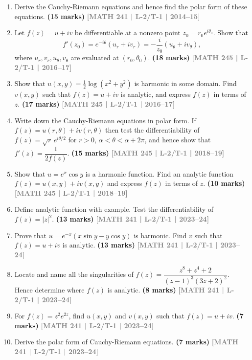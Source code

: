 \documentclass[12pt,a4paper]{article}
\newcommand{\yr}[1]{\hfill\textcolor{gray}{\small\textbf{[#1]}}}
\newcommand{\mk}[1]{\textcolor{orange!70!black}{\small\textbf{(#1 marks)}}}
\begin{document}
\begin{enumerate}
\item Derive the Cauchy-Riemann equations and hence find the polar form of these equations.
\mk{15} \yr{MATH 241 | L-2/T-1 | 2014--15}

\item Let $f(z)=u+iv$ be differentiable at a nonzero point $z_{0}=r_{0}e^{i\theta_{0}}$. Show that
\[
f'(z_{0})=e^{-i\theta}(u_{r}+iv_{r})=-\frac{i}{z_{0}}(u_{\theta}+iv_{\theta}),
\]
where $u_{r},v_{r},u_{\theta},v_{\theta}$ are evaluated at $(r_{0},\theta_{0})$.
\mk{18} \yr{MATH 245 | L-2/T-1 | 2016--17}

\item Show that $u(x,y)=\tfrac{1}{2}\log(x^{2}+y^{2})$ is harmonic in some domain. Find $v(x,y)$ such that $f(z)=u+iv$ is analytic, and express $f(z)$ in terms of $z$.
\mk{17} \yr{MATH 245 | L-2/T-1 | 2016--17}

\item Write down the Cauchy-Riemann equations in polar form. If $f(z)=u(r,\theta)+ iv(r,\theta)$ then test the differentiability of $f(z)=\sqrt{r}\,e^{i\theta/2}$ for $r>0$, $\alpha<\theta<\alpha+2\pi$, and hence show that $f'(z)=\dfrac{1}{2f(z)}$.
\mk{15} \yr{MATH 245 | L-2/T-1 | 2018--19}

\item Show that $u=e^{x}\cos y$ is a harmonic function. Find an analytic function $f(z)=u(x,y)+iv(x,y)$ and express $f(z)$ in terms of $z$.
\mk{10} \yr{MATH 245 | L-2/T-1 | 2018--19}

\item Define analytic function with example. Test the differentiability of $f(z)=|z|^{2}$.
\mk{13} \yr{MATH 241 | L-2/T-1 | 2023--24}

\item Prove that $u=e^{-x}(x\sin y - y\cos y)$ is harmonic. Find $v$ such that $f(z)=u+iv$ is analytic.
\mk{13} \yr{MATH 241 | L-2/T-1 | 2023--24}

\item Locate and name all the singularities of $f(z)=\dfrac{z^{8}+z^{4}+2}{(z-1)^{3}(3z+2)^{2}}$. Hence determine where $f(z)$ is analytic.
\mk{8} \yr{MATH 241 | L-2/T-1 | 2023--24}

\item For $f(z)=z^{2}e^{2z}$, find $u(x,y)$ and $v(x,y)$ such that $f(z)=u+iv$.
\mk{7} \yr{MATH 241 | L-2/T-1 | 2023--24}

\item Derive the polar form of Cauchy-Riemann equations.
\mk{7} \yr{MATH 241 | L-2/T-1 | 2023--24}


\end{enumerate}
\end{document}
